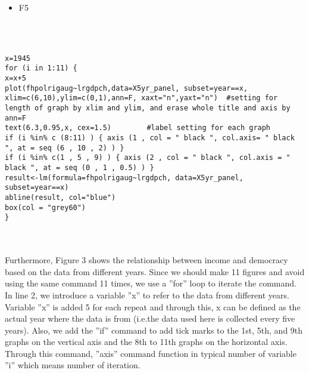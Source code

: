 \begin{itemize}
	\begin{itemize}
		\item F5
	\end{itemize}
	\\
	\\
	
	\begin{lstlisting}
x=1945
for (i in 1:11) {
x=x+5
plot(fhpolrigaug~lrgdpch,data=X5yr_panel, subset=year==x,
xlim=c(6,10),ylim=c(0,1),ann=F, xaxt="n",yaxt="n")  #setting for length of graph by xlim and ylim, and erase whole title and axis by ann=F
text(6.3,0.95,x, cex=1.5)　　　　　#label setting for each graph
if (i %in% c (8:11) ) { axis (1 , col = " black ", col.axis= " black ", at = seq (6 , 10 , 2) ) }
if (i %in% c(1 , 5 , 9) ) { axis (2 , col = " black ", col.axis = " black ", at = seq (0 , 1 , 0.5) ) }
result<-lm(formula=fhpolrigaug~lrgdpch, data=X5yr_panel, subset=year==x)
abline(result, col="blue")
box(col = "grey60")
}
	\end{lstlisting}
	
	\\
	
	\\
	
	Furthermore, Figure 3 shows the relationship between income and democracy based on the
	data from different years. Since we should make 11 figures and avoid using the same command
	11 times, we use a ”for” loop to iterate the command. In line 2, we introduce a variable ”x” to refer to the data from different years. Variable ”x” is added 5 for each repeat
	and through this, x can be defined as the actual year where the data is from (i.e.the data
	used here is collected every five years). Also, we add the ”if” command to add tick marks to
	the 1st, 5th, and 9th graphs on the vertical axis and the 8th to 11th graphs on the horizontal
	axis. Through this command, ”axis” command function in typical number of variable ”i”
	which means number of iteration.
	
\end{itemize}